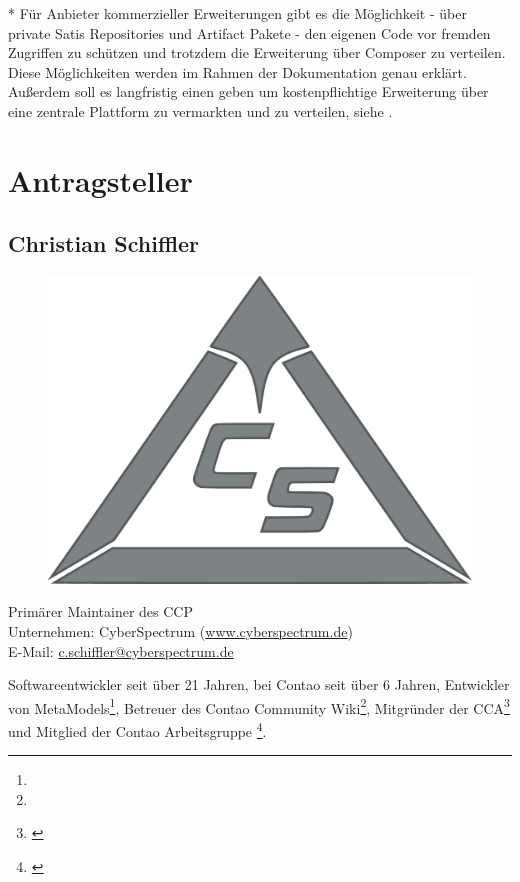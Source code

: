 \documentclass[
paper=a4,
draft=false,%
fontsize=10pt%
]{scrartcl}
\begin{document}
\begin{info}
* Für Anbieter kommerzieller Erweiterungen gibt es die Möglichkeit - über private Satis Repositories und Artifact Pakete - den eigenen Code vor fremden Zugriffen zu schützen und trotzdem die Erweiterung über Composer zu verteilen. Diese Möglichkeiten werden im Rahmen der Dokumentation genau erklärt. Außerdem soll es langfristig einen  geben um kostenpflichtige Erweiterung über eine zentrale Plattform zu vermarkten und zu verteilen, siehe .
\end{info}

\newpage

%
%

\section{Antragsteller}
\label{sec:proposer}

\subsection*{Christian  Schiffler}

\begin{figure}
  \vspace{-50pt}
  \hfill
  \includegraphics[width=.2\textwidth]{bilder/cyberspectrum}
\end{figure}

Primärer Maintainer des CCP \\
Unternehmen: CyberSpectrum (\href{https://www.cyberspectrum.de}{www.cyberspectrum.de}) \\
E-Mail: \href{mailto:c.schiffler@cyberspectrum.de}{c.schiffler@cyberspectrum.de}

Softwareentwickler seit über 21 Jahren, bei Contao seit über 6 Jahren, Entwickler von MetaModels\footnote{}, Betreuer des Contao Community Wiki\footnote{}, Mitgründer der CCA\footnote{\label{fn:cca}} und Mitglied der Contao Arbeitsgruppe \footnote{\label{fn:contao-workgroup-core}}.
\end{document}
